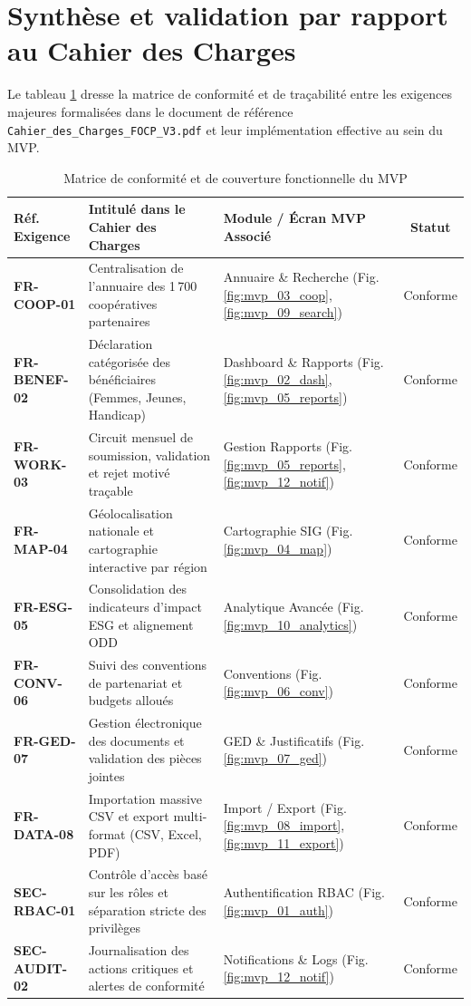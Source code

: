 \clearpage
\section{Synthèse et validation par rapport au Cahier des Charges}

Le tableau \ref{tab:mvp_traceability} dresse la matrice de conformité et de traçabilité entre les exigences majeures formalisées dans le document de référence \texttt{Cahier\_des\_Charges\_FOCP\_V3.pdf} et leur implémentation effective au sein du MVP.

\begin{table}[H]
\centering
\small
\caption{Matrice de conformité et de couverture fonctionnelle du MVP}
\label{tab:mvp_traceability}
\begin{tabularx}{\textwidth}{|p{2.8cm}|X|p{4.6cm}|c|}
\hline
\rowcolor{focpgreen!18}
\textbf{Réf. Exigence} & \textbf{Intitulé dans le Cahier des Charges} & \textbf{Module / Écran MVP Associé} & \textbf{Statut} \\
\hline
\textbf{FR-COOP-01} & Centralisation de l'annuaire des 1\,700 coopératives partenaires & Annuaire \& Recherche (Fig. \ref{fig:mvp_03_coop}, \ref{fig:mvp_09_search}) & Conforme \\
\hline
\textbf{FR-BENEF-02} & Déclaration catégorisée des bénéficiaires (Femmes, Jeunes, Handicap) & Dashboard \& Rapports (Fig. \ref{fig:mvp_02_dash}, \ref{fig:mvp_05_reports}) & Conforme \\
\hline
\textbf{FR-WORK-03} & Circuit mensuel de soumission, validation et rejet motivé traçable & Gestion Rapports (Fig. \ref{fig:mvp_05_reports}, \ref{fig:mvp_12_notif}) & Conforme \\
\hline
\textbf{FR-MAP-04} & Géolocalisation nationale et cartographie interactive par région & Cartographie SIG (Fig. \ref{fig:mvp_04_map}) & Conforme \\
\hline
\textbf{FR-ESG-05} & Consolidation des indicateurs d'impact ESG et alignement ODD & Analytique Avancée (Fig. \ref{fig:mvp_10_analytics}) & Conforme \\
\hline
\textbf{FR-CONV-06} & Suivi des conventions de partenariat et budgets alloués & Conventions (Fig. \ref{fig:mvp_06_conv}) & Conforme \\
\hline
\textbf{FR-GED-07} & Gestion électronique des documents et validation des pièces jointes & GED \& Justificatifs (Fig. \ref{fig:mvp_07_ged}) & Conforme \\
\hline
\textbf{FR-DATA-08} & Importation massive CSV et export multi-format (CSV, Excel, PDF) & Import / Export (Fig. \ref{fig:mvp_08_import}, \ref{fig:mvp_11_export}) & Conforme \\
\hline
\textbf{SEC-RBAC-01} & Contrôle d'accès basé sur les rôles et séparation stricte des privilèges & Authentification RBAC (Fig. \ref{fig:mvp_01_auth}) & Conforme \\
\hline
\textbf{SEC-AUDIT-02} & Journalisation des actions critiques et alertes de conformité & Notifications \& Logs (Fig. \ref{fig:mvp_12_notif}) & Conforme \\
\hline
\end{tabularx}
\end{table}

